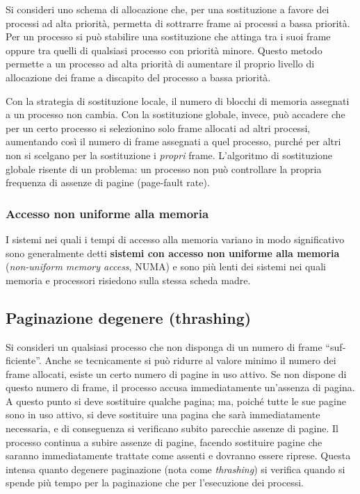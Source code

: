 \documentclass[11pt,a4paper]{article}
\begin{document}
{Si consideri uno schema di allocazione che, per una sostituzione a favore dei
processi ad alta priorità, permetta di sottrarre frame ai processi a bassa priorità. Per un pro­cesso si può stabilire una sostituzione che attinga tra i suoi frame oppure tra quelli di qualsia­si processo con priorità minore. Questo metodo permette a un processo ad alta priorità di au­mentare il proprio livello di allocazione dei frame a discapito del processo a bassa priorità.

Con la strategia di sostituzione locale, il numero di blocchi di memoria assegnati a un
processo non cambia. Con la sostituzione globale, invece, può accadere che per un certo pro­cesso si selezionino solo frame allocati ad altri processi, aumentando così il numero di frame
assegnati a quel processo, purché per altri non si scelgano per la sostituzione i \emph{propri} frame.
L'algoritmo di sostituzione globale risente di un problema: un processo non può con­trollare la propria frequenza di assenze di pagine (page-fault rate).

\subsubsection{Accesso non uniforme alla memoria}
I sistemi nei quali i tempi di accesso alla memoria variano in modo significativo sono gene­ralmente detti \textbf{sistemi con accesso non uniforme alla memoria} (\emph{non-uniform memory access},
NUMA) e sono più lenti dei sistemi nei quali memoria e processori risiedo­no sulla stessa scheda madre.

\subsection{Paginazione degenere (thrashing)}
Si consideri un qualsiasi processo che non disponga di un numero di frame “suf­ficiente”. Anche se tecnicamente si può ridurre al valore minimo il numero dei frame alloca­ti, esiste un certo numero di pagine in uso attivo. Se non dispone di que­sto numero di frame, il processo accusa immediatamente un'assenza di pagina. A questo pun­to si deve sostituire qualche pagina; ma, poiché tutte le sue pagine sono in uso attivo, si deve sostituire una pagina che sarà immediatamente necessaria, e di conseguenza si verificano su­bito parecchie assenze di pagine. Il processo continua a subire assenze di pagine, facendo so­stituire pagine che saranno immediatamente trattate come assenti e dovranno essere riprese.
Questa intensa quanto degenere paginazione (nota come \emph{thrashing}) si verifica quando
si spende più tempo per la paginazione che per l'esecuzione dei processi.

}
\end{document}
